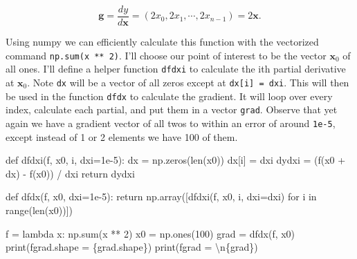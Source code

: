 \documentclass[
  letterpaper,
  DIV=11,
  numbers=noendperiod]{scrreprt}
\newenvironment{Shaded}{\begin{snugshade}}{\end{snugshade}}
\newcommand{\BuiltInTok}[1]{\textcolor[rgb]{0.00,0.23,0.31}{#1}}
\newcommand{\CharTok}[1]{\textcolor[rgb]{0.13,0.47,0.30}{#1}}
\newcommand{\ControlFlowTok}[1]{\textcolor[rgb]{0.00,0.23,0.31}{#1}}
\newcommand{\DecValTok}[1]{\textcolor[rgb]{0.68,0.00,0.00}{#1}}
\newcommand{\FloatTok}[1]{\textcolor[rgb]{0.68,0.00,0.00}{#1}}
\newcommand{\KeywordTok}[1]{\textcolor[rgb]{0.00,0.23,0.31}{#1}}
\newcommand{\NormalTok}[1]{\textcolor[rgb]{0.00,0.23,0.31}{#1}}
\newcommand{\OperatorTok}[1]{\textcolor[rgb]{0.37,0.37,0.37}{#1}}
\newcommand{\SpecialCharTok}[1]{\textcolor[rgb]{0.37,0.37,0.37}{#1}}
\newcommand{\SpecialStringTok}[1]{\textcolor[rgb]{0.13,0.47,0.30}{#1}}
\begin{document}
\[\mathbf{g} = \frac{dy}{d\mathbf{x}} = (2x_0, 2x_1, \cdots, 2x_{n-1}) = 2\mathbf{x}.\]

Using numpy we can efficiently calculate this function with the
vectorized command \texttt{np.sum(x\ **\ 2)}. I'll choose our point of
interest to be the vector \(\mathbf{x}_0\) of all ones. I'll define a
helper function \texttt{dfdxi} to calculate the ith partial derivative
at \(\mathbf{x}_0\). Note \texttt{dx} will be a vector of all zeros
except at \texttt{dx{[}i{]}\ =\ dxi}. This will then be used in the
function \texttt{dfdx} to calculate the gradient. It will loop over
every index, calculate each partial, and put them in a vector
\texttt{grad}. Observe that yet again we have a gradient vector of all
twos to within an error of around \texttt{1e-5}, except instead of 1 or
2 elements we have 100 of them.

\begin{Shaded}
\begin{Highlighting}[]
\KeywordTok{def}\NormalTok{ dfdxi(f, x0, i, dxi}\OperatorTok{=}\FloatTok{1e{-}5}\NormalTok{):}
\NormalTok{    dx }\OperatorTok{=}\NormalTok{ np.zeros(}\BuiltInTok{len}\NormalTok{(x0))}
\NormalTok{    dx[i] }\OperatorTok{=}\NormalTok{ dxi}
\NormalTok{    dydxi }\OperatorTok{=}\NormalTok{ (f(x0 }\OperatorTok{+}\NormalTok{ dx) }\OperatorTok{{-}}\NormalTok{ f(x0)) }\OperatorTok{/}\NormalTok{ dxi}
    \ControlFlowTok{return}\NormalTok{ dydxi}

\KeywordTok{def}\NormalTok{ dfdx(f, x0, dxi}\OperatorTok{=}\FloatTok{1e{-}5}\NormalTok{):}
    \ControlFlowTok{return}\NormalTok{ np.array([dfdxi(f, x0, i, dxi}\OperatorTok{=}\NormalTok{dxi) }\ControlFlowTok{for}\NormalTok{ i }\KeywordTok{in} \BuiltInTok{range}\NormalTok{(}\BuiltInTok{len}\NormalTok{(x0))])}

\NormalTok{f }\OperatorTok{=} \KeywordTok{lambda}\NormalTok{ x: np.}\BuiltInTok{sum}\NormalTok{(x }\OperatorTok{**} \DecValTok{2}\NormalTok{)}
\NormalTok{x0 }\OperatorTok{=}\NormalTok{ np.ones(}\DecValTok{100}\NormalTok{)}
\NormalTok{grad }\OperatorTok{=}\NormalTok{ dfdx(f, x0)}
\BuiltInTok{print}\NormalTok{(}\SpecialStringTok{f\textquotesingle{}grad.shape = }\SpecialCharTok{\{}\NormalTok{grad}\SpecialCharTok{.}\NormalTok{shape}\SpecialCharTok{\}}\SpecialStringTok{\textquotesingle{}}\NormalTok{)}
\BuiltInTok{print}\NormalTok{(}\SpecialStringTok{f\textquotesingle{}grad = }\CharTok{\textbackslash{}n}\SpecialCharTok{\{}\NormalTok{grad}\SpecialCharTok{\}}\SpecialStringTok{\textquotesingle{}}\NormalTok{)}
\end{Highlighting}
\end{Shaded}
\end{document}
